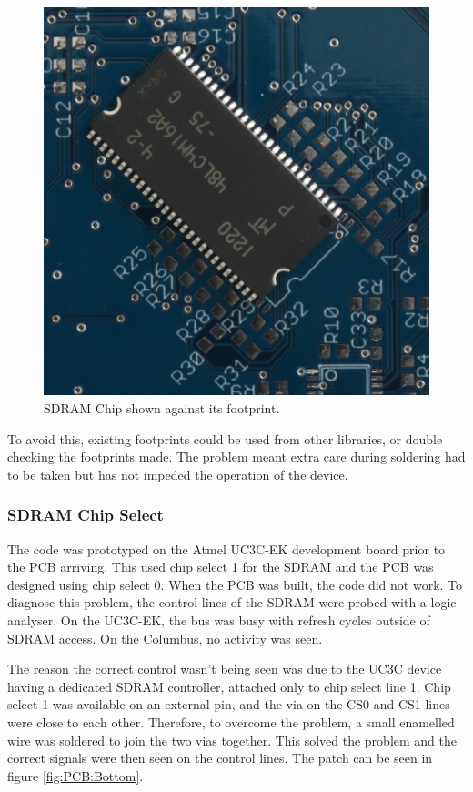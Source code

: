 \begin{figure}
\centering
\includegraphics[width=\textwidth / 2]{./Figures/PCB_SDRAM.jpg}
\caption{SDRAM Chip shown against its footprint.}
\label{fig:SDRAM_Err}
\end{figure}

To avoid this, existing footprints could be used from other libraries, or double checking the footprints made. The problem meant extra care during soldering had to be taken but has not impeded the operation of the device. 

\subsubsection{SDRAM Chip Select}
The code was prototyped on the Atmel UC3C-EK development board prior to the PCB arriving. This used chip select 1 for the SDRAM and the PCB was designed using chip select 0. When the PCB was built, the code did not work. To diagnose this problem, the control lines of the SDRAM were probed with a logic analyser. On the UC3C-EK, the bus was busy with refresh cycles outside of SDRAM access. On the Columbus, no activity was seen. 

The reason the correct control wasn't being seen was due to the UC3C device having a dedicated SDRAM controller, attached only to chip select line 1. Chip select 1 was available on an external pin, and the via on the CS0 and CS1 lines were close to each other. Therefore, to overcome the problem, a small enamelled wire was soldered to join the two vias together. This solved the problem and the correct signals were then seen on the control lines. The patch can be seen in figure \ref{fig:PCB:Bottom}. 

